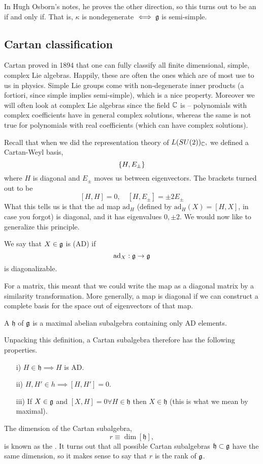 In Hugh Osborn's notes, he proves the other direction, so this turns out to be an if and only if. That is, $\kappa$ is nondegenerate $\iff \mathfrak{g}$ is semi-simple.

\subsection*{Cartan classification} Cartan proved in 1894 that one can fully classify all finite dimensional, simple, complex Lie algebras. Happily, these are often the ones which are of most use to us in physics. Simple Lie groups come with non-degenerate inner products (a fortiori, since simple implies semi-simple), which is a nice property. Moreover we will often look at complex Lie algebras since the field $\mathbb{C}$ is -- polynomials with complex coefficients have in general complex solutions, whereas the same is not true for polynomials with real coefficients (which can have complex solutions).

Recall that when we did the representation theory of $L(SU(2))_{\mathbb{C}},$ we defined a Cartan-Weyl basis,
$$\{H,E_\pm\}$$ where $H$ is diagonal and $E_\pm$ moves us between eigenvectors. The brackets turned out to be
$$[H,H]=0,\quad [H,E_\pm]=\pm 2 E_{\pm}$$
What this tells us is that the ad map $\text{ad}_H$ (defined by $\text{ad}_H(X)=[H,X]$, in case you forgot) is diagonal, and it has eigenvalues $0,\pm 2$. We would now like to generalize this principle.
\begin{defn}
We say that $X\in \mathfrak{g}$ is  (AD) if
$$\text{ad}_X:\mathfrak{g} \to \mathfrak{g}$$
is diagonalizable.
\end{defn}
For a matrix, this meant that we could write the map as a diagonal matrix by a similarity transformation. More generally, a map is diagonal if we can construct a complete basis for the space out of eigenvectors of that map.

\begin{defn}
A  $\mathfrak{h}$ of $\mathfrak{g}$ is a maximal abelian subalgebra containing only AD elements.
\end{defn}
Unpacking this definition, a Cartan subalgebra therefore has the following properties.
\begin{itemize}
    \item[i)] $H\in \mathfrak{h}\implies H$ is AD.
    \item[ii)] $H,H'\in h \implies [H,H']=0.$
    \item[iii)] If $X\in \mathfrak{g}$ and $[X,H]=0 \forall H \in \mathfrak{h}$ then $X\in \mathfrak{h}$ (this is what we mean by maximal).
\end{itemize}
\begin{defn}
The dimension of the Cartan subalgebra,
$$r\equiv \dim[\mathfrak{h}],$$
is known as the . It turns out that all possible Cartan subalgebras $\mathfrak{h}\subset \mathfrak{g}$ have the same dimension, so it makes sense to say that $r$ is the rank of $\mathfrak{g}$.
\end{defn}

